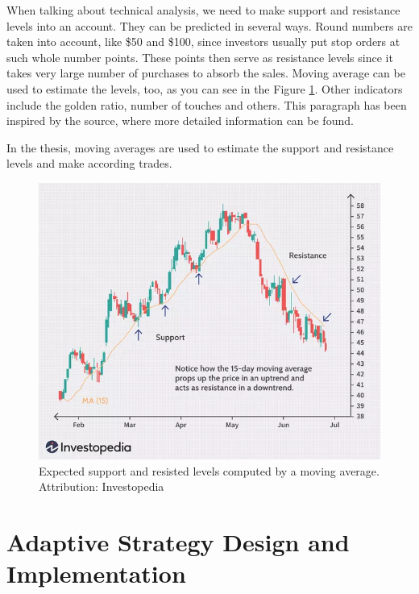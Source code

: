 When talking about technical analysis, we need to make support and resistance levels into an account. They can be predicted in several ways. Round numbers are taken into account, like \$50 and \$100, since investors usually put stop orders at such whole number points. These points then serve as resistance levels since it takes very large number of purchases to absorb the sales. Moving average can be used to estimate the levels, too, as you can see in the Figure \ref{ma-support-resistance}. Other indicators include the golden ratio, number of touches and others. This paragraph has been inspired by the \cite{investopedia:support-and-resistance} source, where more detailed information can be found.

In the thesis, moving averages are used to estimate the support and resistance levels and make according trades.

\begin{figure}[!hbt]
    \centering
    \includegraphics[width=\columnwidth]{figures/ma-support-resistance.png}
    \caption{Expected support and resisted levels computed by a moving average. Attribution: Investopedia \cite{investopedia:support-and-resistance}}
    \label{ma-support-resistance}
\end{figure}



\chapter{Adaptive Strategy Design and Implementation}
\label{chapter-implementation}

